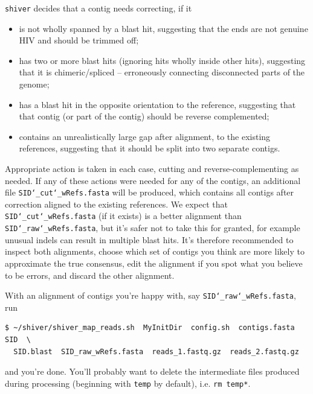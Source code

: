 \documentclass{article}
\newcommand{\shiv}{\texttt{shiver}\xspace}
\let\c\texttt
\begin{document}
\shiv decides that a contig needs correcting, if it
\begin{itemize}
 \item is not wholly spanned by a blast hit, suggesting that the ends are not genuine HIV and should be trimmed off;
 \item has two or more blast hits (ignoring hits wholly inside other hits), suggesting that it is chimeric/spliced -- erroneously connecting disconnected parts of the genome;
 \item has a blast hit in the opposite orientation to the reference, suggesting that that contig (or part of the contig) should be reverse complemented;
 \item contains an unrealistically large gap after alignment, to the existing references, suggesting that it should be split into two separate contigs.
\end{itemize}
Appropriate action is taken in each case, cutting and reverse-complementing as needed.
If any of these actions were needed for any of the contigs, an additional file \c{SID\char`_cut\char`_wRefs.fasta} will be produced, which contains all contigs after correction aligned to the existing references.
We expect that \c{SID\char`_cut\char`_wRefs.fasta} (if it exists) is a better alignment than \c{SID\char`_raw\char`_wRefs.fasta}, but it's safer not to take this for granted, for example unusual indels can result in multiple blast hits.
It's therefore recommended to inspect both alignments, choose which set of contigs you think are more likely to approximate the true consensus, edit the alignment if you spot what you believe to be errors, and discard the other alignment. 

With an alignment of contigs you're happy with, say \c{SID\char`_raw\char`_wRefs.fasta}, run
\begin{Verbatim}[samepage=true]
$ ~/shiver/shiver_map_reads.sh  MyInitDir  config.sh  contigs.fasta  SID  \
  SID.blast  SID_raw_wRefs.fasta  reads_1.fastq.gz  reads_2.fastq.gz
\end{Verbatim}
and you're done.
You'll probably want to delete the intermediate files produced during processing (beginning with \c{temp} by default), i.e. \c{rm temp*}.
\end{document}
